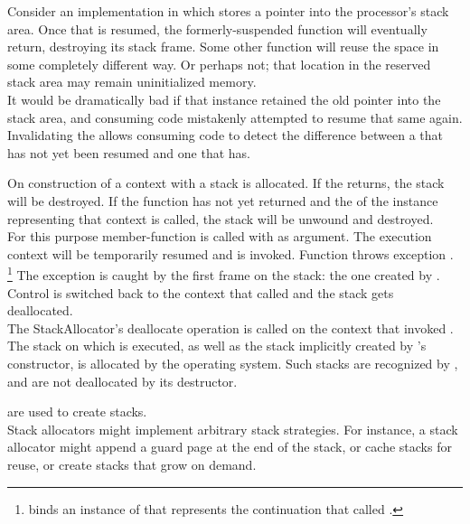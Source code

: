 Consider an implementation in which \cont stores a pointer into the
processor's stack area. Once that \cont is resumed, the formerly-suspended
function will eventually return, destroying its stack frame. Some other
function will reuse the space in some completely different way. Or perhaps
not; that location in the reserved stack area may remain uninitialized memory.\\

It would be dramatically bad if that \cont instance retained the old pointer
into the stack area, and consuming code mistakenly attempted to resume that
same \cont again. Invalidating the \cont allows consuming code to detect the
difference between a \cont that has not yet been resumed and one that has.


\label{subsec:destruction}

On construction of a context with \callcc a stack is allocated. If the
\entryfn returns, the stack will be destroyed. If the function has not yet
returned and the  of the \cont instance
representing that context is called, the stack will be unwound and destroyed.\\

For this purpose member-function \resumewith is called with \unwindcont as
argument. The execution context will be temporarily resumed and \unwindcont is
invoked. Function \unwindcont throws exception \unwindex.
\footnote{\unwindex binds an instance of \cont that represents the continuation
that called \resumewith.}
The exception is caught by the first frame on the stack: the one created by
\callcc. Control is switched back to the context that called \dtor and the
stack gets deallocated.\\

The StackAllocator's deallocate operation is called on the context that invoked
\dtor.\\

The stack on which  is executed, as well as the stack implicitly
created by 's constructor, is allocated by the operating
system. Such stacks are recognized by \cont, and are not deallocated by its
destructor.


\label{subsec:stackalloc}

are used to create stacks.\\

Stack allocators might implement arbitrary stack strategies. For instance, a
stack allocator might append a guard page at the end of the stack, or cache
stacks for reuse, or create stacks that grow on demand.\\

